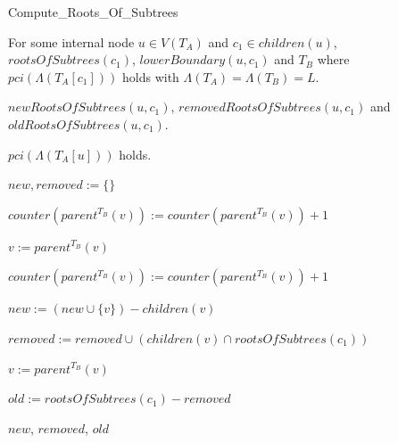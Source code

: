 \documentclass{article}
\newcommand{\leafset}{\Lambda}
\begin{document}
    \begin{algorithm}
        \caption{Compute\_Roots\_Of\_Subtrees}
        \label{alg:computerootsofsubtrees}

        \begin{algorithmic}[1]
            \Input For some internal node $u \in V(T_A)$ and $c_1 \in children(u)$, $rootsOfSubtrees(c_1)$, $lowerBoundary(u, c_1)$ and $T_B$ where $pci(\leafset(T_A[c_1]))$ holds with $\leafset(T_A) = \leafset(T_B) = L$.

            \Output $newRootsOfSubtrees(u, c_1)$, $removedRootsOfSubtrees(u, c_1)$ and $oldRootsOfSubtrees(u, c_1)$.

            \SideEffect $pci(\leafset(T_A[u]))$ holds.

            \State $new, removed := \{\}$

                \State $counter(parent^{T_B}(v)) := counter(parent^{T_B}(v)) + 1$

                \State $v := parent^{T_B}(v)$

                    \State $counter(parent^{T_B}(v)) := counter(parent^{T_B}(v)) + 1$

                    \State $new := (new \cup \{v\}) - children(v)$

                    \State $removed := removed \cup (children(v) \cap rootsOfSubtrees(c_1))$

                    \State $v := parent^{T_B}(v)$
                \EndWhile
            \EndFor

            \State $old := rootsOfSubtrees(c_1) - removed$

            \State \Return $new$, $removed$, $old$
        \end{algorithmic}
    \end{algorithm}
\end{document}
